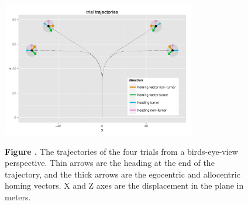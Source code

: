 \documentclass{frontiersSCNS} %
\begin{document}
\begin{figure}[h!]
\begin{center}
\includegraphics[width=0.75\textwidth]{figures/trajectories.pdf}
\end{center}
\textbf{\label{fig:02} Figure .}{ The trajectories of the four trials from a birds-eye-view perspective. Thin arrows are the heading at the end of the trajectory, and the thick arrows are the egocentric and allocentric homing vectors. X and Z axes are the displacement in the plane in meters.}
   \label{fig:trajectories}
\end{figure}
\end{document}
